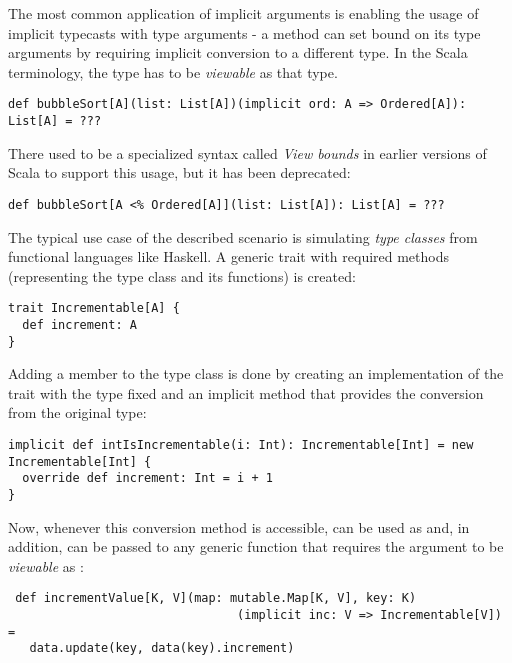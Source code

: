 The most common application of implicit arguments is enabling the usage of implicit typecasts with type arguments - a method can set bound on its type arguments by requiring implicit conversion to a different type. In the Scala terminology, the type has to be \textit{viewable} as that type.

\lstset{style=Scala}
\begin{lstlisting}
def bubbleSort[A](list: List[A])(implicit ord: A => Ordered[A]): List[A] = ???
\end{lstlisting}

There used to be a specialized syntax called \textit{View bounds} in earlier versions of Scala to support this usage, but it has been deprecated:

\lstset{style=Scala}
\begin{lstlisting}
def bubbleSort[A <% Ordered[A]](list: List[A]): List[A] = ???
\end{lstlisting}

The typical use case of the described scenario is simulating \textit{type classes} from functional languages like Haskell. A generic trait with required methods (representing the type class and its functions) is created:

\lstset{style=Scala}
\begin{lstlisting}
trait Incrementable[A] {
  def increment: A
}
\end{lstlisting}

 Adding a member to the type class is done by creating an implementation of the trait with the type fixed and an implicit method that provides the conversion from the original type:
 
 \lstset{style=Scala}
 \begin{lstlisting}
implicit def intIsIncrementable(i: Int): Incrementable[Int] = new Incrementable[Int] {
  override def increment: Int = i + 1
}
 \end{lstlisting}
 
 Now, whenever this conversion method is accessible,  can be used as  and, in addition, can be passed to any generic function that requires the argument to be \textit{viewable} as :
 
  \lstset{style=Scala}
 \begin{lstlisting}
 def incrementValue[K, V](map: mutable.Map[K, V], key: K)
                                (implicit inc: V => Incrementable[V]) =
   data.update(key, data(key).increment)
  \end{lstlisting}
  
